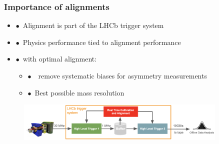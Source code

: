 \documentclass[xcolor=dvipsnames, aspectratio=1610, 12pt]{beamer}
\begin{document}
\begin{frame}\frametitle{Importance of alignments}
  \begin{itemize}
    \item $\bullet$\, Alignment is part of the LHCb trigger system
    \item $\bullet$\, Physics performance tied to alignment performance
    \item $\bullet$\, with optimal alignment:
    \begin{itemize}
      \item $\bullet$\, \to\, remove systematic biases for asymmetry measurements
      \item $\bullet$\, Best possible mass resolution
    \end{itemize}
  \end{itemize}
  \begin{figure}
      \includegraphics[width=0.9\textwidth]{logos/dataflow.png}%
  \end{figure}
\end{frame}
\end{document}
